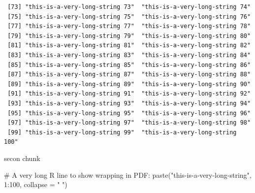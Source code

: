 \documentclass[
  letterpaper,
  DIV=11,
  numbers=noendperiod]{scrartcl}
\newenvironment{Shaded}{\begin{snugshade}}{\end{snugshade}}
\newcommand{\AttributeTok}[1]{\textcolor[rgb]{0.40,0.45,0.13}{#1}}
\newcommand{\CommentTok}[1]{\textcolor[rgb]{0.37,0.37,0.37}{#1}}
\newcommand{\DecValTok}[1]{\textcolor[rgb]{0.68,0.00,0.00}{#1}}
\newcommand{\FunctionTok}[1]{\textcolor[rgb]{0.28,0.35,0.67}{#1}}
\newcommand{\NormalTok}[1]{\textcolor[rgb]{0.00,0.23,0.31}{#1}}
\newcommand{\SpecialCharTok}[1]{\textcolor[rgb]{0.37,0.37,0.37}{#1}}
\newcommand{\StringTok}[1]{\textcolor[rgb]{0.13,0.47,0.30}{#1}}
\begin{document}
\begin{verbatim}
 [73] "this-is-a-very-long-string 73"  "this-is-a-very-long-string 74" 
 [75] "this-is-a-very-long-string 75"  "this-is-a-very-long-string 76" 
 [77] "this-is-a-very-long-string 77"  "this-is-a-very-long-string 78" 
 [79] "this-is-a-very-long-string 79"  "this-is-a-very-long-string 80" 
 [81] "this-is-a-very-long-string 81"  "this-is-a-very-long-string 82" 
 [83] "this-is-a-very-long-string 83"  "this-is-a-very-long-string 84" 
 [85] "this-is-a-very-long-string 85"  "this-is-a-very-long-string 86" 
 [87] "this-is-a-very-long-string 87"  "this-is-a-very-long-string 88" 
 [89] "this-is-a-very-long-string 89"  "this-is-a-very-long-string 90" 
 [91] "this-is-a-very-long-string 91"  "this-is-a-very-long-string 92" 
 [93] "this-is-a-very-long-string 93"  "this-is-a-very-long-string 94" 
 [95] "this-is-a-very-long-string 95"  "this-is-a-very-long-string 96" 
 [97] "this-is-a-very-long-string 97"  "this-is-a-very-long-string 98" 
 [99] "this-is-a-very-long-string 99"  "this-is-a-very-long-string 100"
\end{verbatim}

secon chunk

\begin{Shaded}
\begin{Highlighting}[]
\CommentTok{\# A very long R line to show wrapping in PDF:}
\FunctionTok{paste}\NormalTok{(}\StringTok{"this{-}is{-}a{-}very{-}long{-}string"}\NormalTok{, }\DecValTok{1}\SpecialCharTok{:}\DecValTok{100}\NormalTok{, }\AttributeTok{collapse =} \StringTok{" "}\NormalTok{)}
\end{Highlighting}
\end{Shaded}
\end{document}
